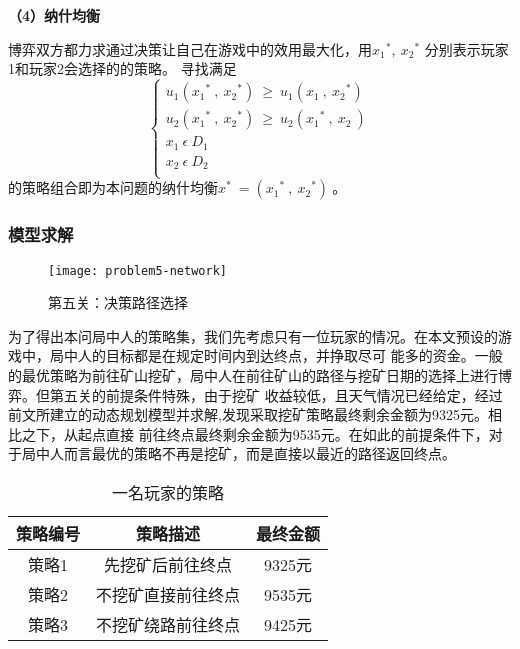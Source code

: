 \documentclass[bwprint]{cumcmthesis} %
\begin{document}
\textbf{（4）纳什均衡}

博弈双方都力求通过决策让自己在游戏中的效用最大化，用$ {x_1}^\ast,\ {x_2}^\ast $ 分别表示玩家1和玩家2会选择的的策略。
寻找满足
\begin{equation}
    \begin{cases}
 u_1({x_1}^\ast\ ,\ {x_2}^\ast)\ \geq\ u_1(x_1\ ,\ {x_2}^\ast)  \\
 u_2({x_1}^\ast\ ,\ {x_2}^\ast)\ \geq\ u_2({x_1}^\ast\ ,\ x_2\ )  \\
 x_1\ \epsilon\ D_1\  \\
 x_2\ \epsilon\ D_2\  \\
    \end{cases}
\end{equation}
的策略组合即为本问题的纳什均衡$ x^\ast\ =({x_1}^\ast\ ,\ {x_2}^\ast)\ $。

\subsubsection{模型求解}\label{p5_solution}

\begin{figure}[!h]
    \centering
    \texttt{[image: problem5-network]}
    \caption{第五关：决策路径选择}
    \label{fig:problem5-network}
\end{figure}

为了得出本问局中人的策略集，我们先考虑只有一位玩家的情况。在本文预设的游戏中，局中人的目标都是在规定时间内到达终点，并挣取尽可
能多的资金。一般的最优策略为前往矿山挖矿，局中人在前往矿山的路径与挖矿日期的选择上进行博弈。但第五关的前提条件特殊，由于挖矿
收益较低，且天气情况已经给定，经过前文所建立的动态规划模型并求解,发现采取挖矿策略最终剩余金额为9325元。相比之下，从起点直接
前往终点最终剩余金额为9535元。在如此的前提条件下，对于局中人而言最优的策略不再是挖矿，而是直接以最近的路径返回终点。

\begin{table}[!htbp]
    \caption{一名玩家的策略}\label{tab:p5strategy1} 
    \centering
    \begin{tabular}{ccc}
        \toprule[1.5pt]
        策略编号 & 策略描述 & 最终金额 \\
        \midrule[1pt]
        策略1 & 先挖矿后前往终点 & 9325元 \\
        策略2 & 不挖矿直接前往终点 & 9535元\\
        策略3 & 不挖矿绕路前往终点 & 9425元\\
        \bottomrule[1.5pt]
    \end{tabular}
\end{table}
\end{document}
